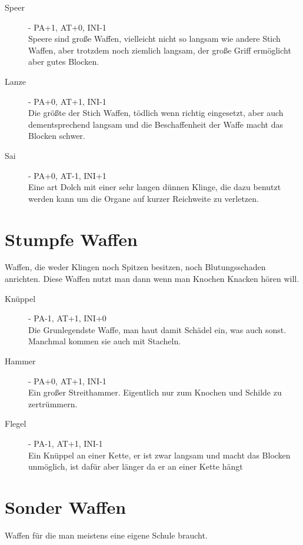 \documentclass[a4paper,12pt,oneside]{book}
\begin{document}
\begin{description}
\item[Speer] - PA+1, AT+0, INI-1
\\Speere sind große Waffen, vielleicht nicht so langsam wie andere Stich Waffen, aber trotzdem noch ziemlich langsam, der große Griff ermöglicht aber gutes Blocken.
\item[Lanze] - PA+0, AT+1, INI-1
\\Die größte der Stich Waffen, tödlich wenn richtig eingesetzt, aber auch dementsprechend langsam und die Beschaffenheit der Waffe macht das Blocken schwer.
\item[Sai] - PA+0, AT-1, INI+1
\\Eine art Dolch mit einer sehr langen dünnen Klinge, die dazu benutzt werden kann um die Organe auf kurzer Reichweite zu verletzen.
\end{description}

\section{Stumpfe Waffen}
Waffen, die weder Klingen noch Spitzen besitzen, noch Blutungsschaden anrichten. Diese Waffen nutzt man dann wenn man Knochen Knacken hören will. 

\begin{description}
\item[Knüppel] - PA-1, AT+1, INI+0
\\Die Grunlegendste Waffe, man haut damit Schädel ein, was auch sonst. Manchmal kommen sie auch mit Stacheln.
\item[Hammer] - PA+0, AT+1, INI-1
\\Ein großer Streithammer. Eigentlich nur zum Knochen und Schilde zu zertrümmern.
\item[Flegel] - PA-1, AT+1, INI-1
\\Ein Knüppel an einer Kette, er ist zwar langsam und macht das Blocken unmöglich, ist dafür aber länger da er an einer Kette hängt
\end{description}

\section{Sonder Waffen}
Waffen für die man meistens eine eigene Schule braucht.
\end{document}
